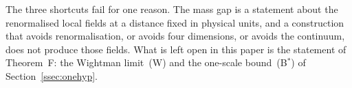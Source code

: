 \medskip
The three shortcuts fail for one reason. The mass gap is a statement about
the renormalised local fields at a distance fixed in physical units, and a
construction that avoids renormalisation, or avoids four dimensions, or
avoids the continuum, does not produce those fields. What is left open in
this paper is the statement of Theorem~F: the Wightman limit~(W) and the
one-scale bound~\textup{(B$^{*}$)} of Section~\ref{ssec:onehyp}.
